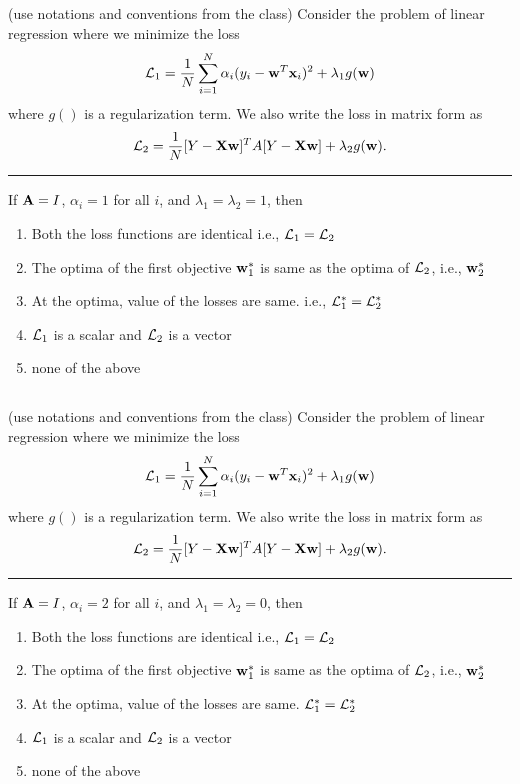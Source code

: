 \begin{frame}
\section{}
(use notations  and conventions from the class) Consider the problem of linear regression where we
minimize the loss
\[{\cal L}_1 = \frac{1}{N}\sum_{i=1}^N \alpha_i (y_i - {\bf w}^T{\bf x}_i)^2 + \lambda_1 g({\bf w})\] where $g()$ is a regularization term. We also write the loss in matrix form as \[ {\cal L}_2 = \frac{1}{N} [Y-{\bf X}{\bf w}]^TA[Y-{\bf X}{\bf w}] + \lambda_2 g({\bf w}). \]

\hrule

If ${\bf A} = I$, $\alpha_i = 1$ for all $i$, and $\lambda_1 = \lambda_2 = 1$, then
\begin{enumerate}
\item Both the loss functions are identical i.e., ${\cal L}_1 = {\cal L}_2$   %
\item The optima of the first objective ${\bf w}_1^*$ is same as the optima of ${\cal L}_2$, i.e., ${\bf w}_2^*$    %
\item At the optima,  value of the losses are same. i.e., ${\cal L}_1^* = {\cal L}_2^*$   %
\item ${\cal L}_1$ is a scalar and ${\cal L}_2$ is a vector
\item none of the above
\end{enumerate}
\end{frame}

\begin{frame}
\section{}
(use notations  and conventions from the class) Consider the problem of linear regression where we
minimize the loss
\[{\cal L}_1 = \frac{1}{N}\sum_{i=1}^N \alpha_i (y_i - {\bf w}^T{\bf x}_i)^2 + \lambda_1 g({\bf w})\] where $g()$ is a regularization term. We also write the loss in matrix form as \[ {\cal L}_2 = \frac{1}{N} [Y-{\bf X}{\bf w}]^TA[Y-{\bf X}{\bf w}] + \lambda_2 g({\bf w}). \]

\hrule

If ${\bf A} = I$, $\alpha_i = 2$ for all $i$, and $\lambda_1 = \lambda_2 = 0$, then
\begin{enumerate}
\item Both the loss functions are identical i.e., ${\cal L}_1 = {\cal L}_2$
\item The optima of the first objective ${\bf w}_1^*$ is same as the optima of ${\cal L}_2$, i.e., ${\bf w}_2^*$    %
\item At the optima, value of the losses are same. ${\cal L}_1^* = {\cal L}_2^*$
\item ${\cal L}_1$ is a scalar and ${\cal L}_2$ is a vector
\item none of the above
\end{enumerate}
\end{frame}

